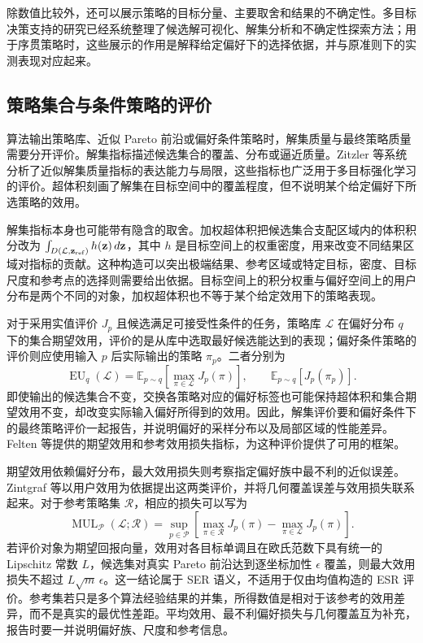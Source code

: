 除数值比较外，还可以展示策略的目标分量、主要取舍和结果的不确定性。多目标决策支持的研究已经系统整理了候选解可视化、解集分析和不确定性探索方法\cite{osika2023decisionsupport}；用于序贯策略时，这些展示的作用是解释给定偏好下的选择依据，并与原准则下的实测表现对应起来。

\subsection{策略集合与条件策略的评价}\label{sec:eval-sets}

算法输出策略库、近似 Pareto 前沿或偏好条件策略时，解集质量与最终策略质量需要分开评价。解集指标描述候选集合的覆盖、分布或逼近质量。Zitzler 等系统分析了近似解集质量指标的表达能力与局限\cite{zitzler2003}，这些指标也广泛用于多目标强化学习的评价\cite{vamplew2011}。超体积刻画了解集在目标空间中的覆盖程度，但不说明某个给定偏好下所选策略的效用。

解集指标本身也可能带有隐含的取舍。加权超体积把候选集合支配区域内的体积积分改为 $\int_{D(\mathcal L,\mathbf z_{\rm ref})}h(\mathbf z)\,d\mathbf z$，其中 $h$ 是目标空间上的权重密度，用来改变不同结果区域对指标的贡献\cite{zitzler2007weighted}。这种构造可以突出极端结果、参考区域或特定目标，密度、目标尺度和参考点的选择则需要给出依据。目标空间上的积分权重与偏好空间上的用户分布是两个不同的对象，加权超体积也不等于某个给定效用下的策略表现。

对于采用实值评价 $J_p$ 且候选满足可接受性条件的任务，策略库 $\mathcal L$ 在偏好分布 $q$ 下的集合期望效用，评价的是从库中选取最好候选能达到的表现；偏好条件策略的评价则应使用输入 $p$ 后实际输出的策略 $\pi_p$。二者分别为
\begin{equation}
\operatorname{EU}_q(\mathcal L)
=\mathbb E_{p\sim q}\!\left[\max_{\pi\in\mathcal L}J_p(\pi)\right],
\qquad
\mathbb E_{p\sim q}[J_p(\pi_p)].
\end{equation}
即使输出的候选集合不变，交换各策略对应的偏好标签也可能保持超体积和集合期望效用不变，却改变实际输入偏好所得到的效用。因此，解集评价要和偏好条件下的最终策略评价一起报告，并说明偏好的采样分布以及局部区域的性能差异。Felten 等提供的期望效用和参考效用损失指标，为这种评价提供了可用的框架\cite{felten2023}。


期望效用依赖偏好分布，最大效用损失则考察指定偏好族中最不利的近似误差。Zintgraf 等以用户效用为依据提出这两类评价，并将几何覆盖误差与效用损失联系起来\cite{zintgraf2015quality}。对于参考策略集 $\mathcal R$，相应的损失可以写为
\begin{equation}
\operatorname{MUL}_{\mathcal P}(\mathcal L;\mathcal R)
=\sup_{p\in\mathcal P}\left[
\max_{\pi\in\mathcal R}J_p(\pi)
-\max_{\pi\in\mathcal L}J_p(\pi)\right].
\end{equation}
若评价对象为期望回报向量，效用对各目标单调且在欧氏范数下具有统一的 Lipschitz 常数 $L$，候选集对真实 Pareto 前沿达到逐坐标加性 $\epsilon$ 覆盖，则最大效用损失不超过 $L\sqrt m\,\epsilon$。这一结论属于 SER 语义，不适用于仅由均值构造的 ESR 评价。参考集若只是多个算法经验结果的并集，所得数值是相对于该参考的效用差异，而不是真实的最优性差距。平均效用、最不利偏好损失与几何覆盖互为补充，报告时要一并说明偏好族、尺度和参考信息。

